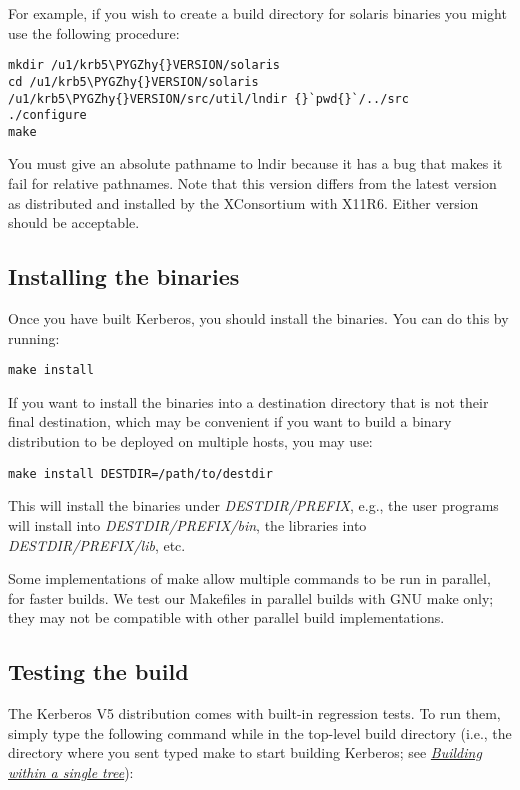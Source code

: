 \documentclass[letterpaper,10pt,english]{sphinxmanual}
\def\PYGZhy{\char`\-}
\begin{document}
For example, if you wish to create a build directory for solaris
binaries you might use the following procedure:

\begin{Verbatim}[commandchars=\\\{\}]
mkdir /u1/krb5\PYGZhy{}VERSION/solaris
cd /u1/krb5\PYGZhy{}VERSION/solaris
/u1/krb5\PYGZhy{}VERSION/src/util/lndir {}`pwd{}`/../src
./configure
make
\end{Verbatim}

You must give an absolute pathname to lndir because it has a bug that
makes it fail for relative pathnames.  Note that this version differs
from the latest version as distributed and installed by the
XConsortium with X11R6.  Either version should be acceptable.


\subsection{Installing the binaries}
\label{build/doing_build:installing-the-binaries}
Once you have built Kerberos, you should install the binaries. You can
do this by running:

\begin{Verbatim}[commandchars=\\\{\}]
make install
\end{Verbatim}

If you want to install the binaries into a destination directory that
is not their final destination, which may be convenient if you want to
build a binary distribution to be deployed on multiple hosts, you may
use:

\begin{Verbatim}[commandchars=\\\{\}]
make install DESTDIR=/path/to/destdir
\end{Verbatim}

This will install the binaries under \emph{DESTDIR/PREFIX}, e.g., the user
programs will install into \emph{DESTDIR/PREFIX/bin}, the libraries into
\emph{DESTDIR/PREFIX/lib}, etc.

Some implementations of make allow multiple commands to be run in
parallel, for faster builds.  We test our Makefiles in parallel builds
with GNU make only; they may not be compatible with other parallel
build implementations.


\subsection{Testing the build}
\label{build/doing_build:testing-the-build}
The Kerberos V5 distribution comes with built-in regression tests.  To
run them, simply type the following command while in the top-level
build directory (i.e., the directory where you sent typed make to
start building Kerberos; see {\hyperref[build/doing_build:do-build]{\emph{Building within a single tree}}}):
\end{document}
